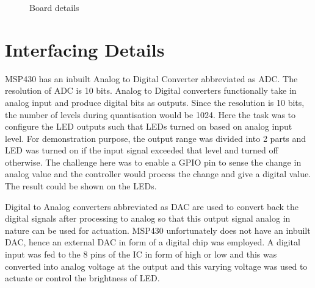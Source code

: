 \documentclass[12pt, letterpaper]{article}
\begin{document}
\begin{figure}[t]
	\centering
	\caption{Board details}
	\label{fig:board}
\end{figure}

\section{Interfacing Details}
      
MSP430 has an inbuilt Analog to Digital Converter abbreviated as ADC. The resolution of ADC is 10 bits. Analog to Digital converters functionally take in analog input and produce digital bits as outputs. Since the resolution is 10 bits, the number of levels during quantisation would be 1024. Here the task was to configure the LED outputs such that LEDs turned on based on analog input level. For demonstration purpose, the output range was divided into 2 parts and LED was turned on if the input signal exceeded that level and turned off otherwise. The challenge here was to enable a GPIO pin to sense the change in analog value and the controller would process the change and give a digital value. The result could be shown on the LEDs.

Digital to Analog converters abbreviated as DAC are used to convert back the digital signals after processing to analog so that this output signal analog in nature can be used for actuation. MSP430 unfortunately does not have an inbuilt DAC, hence an external DAC in form of a digital chip was employed. A digital input was fed to the 8 pins of the IC in form of high or low and this was converted into analog voltage at the output and this varying voltage was used to actuate or control the brightness of LED.
\end{document}
